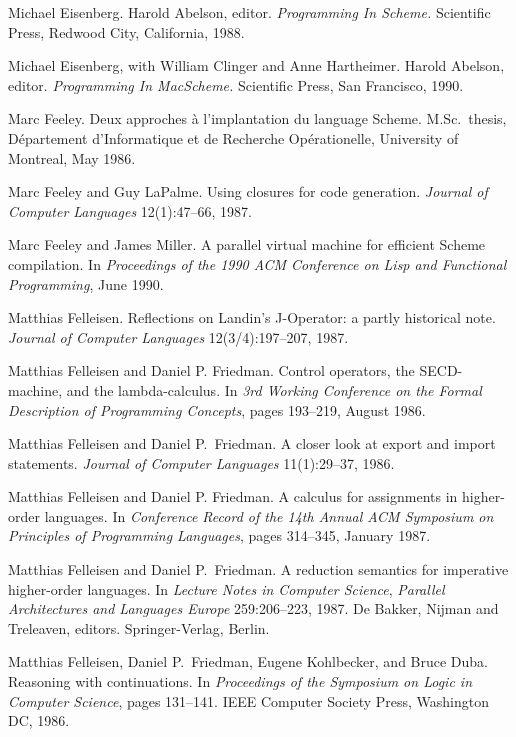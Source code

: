 \begin{thebibliography}{999}
Michael Eisenberg.
Harold Abelson, editor.
{\em Programming In Scheme.}
Scientific Press, Redwood City, California, 1988.

Michael Eisenberg, with William Clinger and Anne Hartheimer.
Harold Abelson, editor.
{\em Programming In MacScheme.}
Scientific Press, San Francisco, 1990.

Marc Feeley.
Deux approches \`{a} l'implantation du language Scheme.
M.Sc.~thesis, D\'{e}partement d'Informatique et de Recherche
  Op\'{e}rationelle, University of Montreal, May 1986.

Marc Feeley and Guy LaPalme.
Using closures for code generation.
{\em Journal of Computer Languages} 12(1):47--66, 1987.

Marc Feeley and James Miller.
A parallel virtual machine for efficient Scheme compilation.
In {\em Proceedings of the 1990 ACM Conference on Lisp and
  Functional Programming}, June 1990.

Matthias Felleisen.
Reflections on Landin's J-Operator: a partly historical note.
{\em Journal of Computer Languages} 12(3/4):197--207, 1987.

Matthias Felleisen and Daniel P. Friedman.
Control operators, the SECD-machine, and the lambda-calculus.
In {\em 3rd Working Conference on the Formal Description of
   Programming Concepts}, pages 193--219, August 1986.

Matthias Felleisen and Daniel P.~Friedman.
A closer look at export and import statements.
{\em Journal of Computer Languages} 11(1):29--37, 1986.

Matthias Felleisen and Daniel P. Friedman.
A calculus for assignments in higher-order languages.
In {\em Conference Record of the 14th Annual ACM Symposium
  on Principles of Programming Languages}, pages 314--345, January 1987.

Matthias Felleisen and Daniel P.~Friedman.
A reduction semantics for imperative higher-order languages.
In {\em Lecture Notes in Computer Science}, 
{\em Parallel Architectures and Languages Europe} 259:206--223, 1987.
De Bakker, Nijman and Treleaven, editors.
Springer-Verlag, Berlin.

Matthias Felleisen, Daniel P.~Friedman, Eugene Kohlbecker, and Bruce Duba.
Reasoning with continuations.
In {\em Proceedings of the Symposium on Logic in Computer Science},
  pages 131--141.
IEEE Computer Society Press, Washington DC, 1986.


\end{thebibliography}
